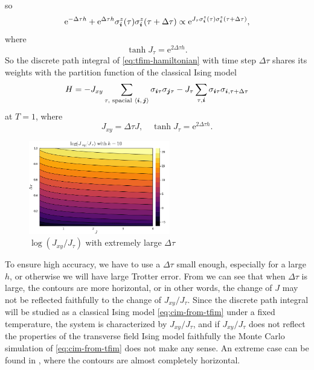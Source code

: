 \documentclass[hyperref, a4paper]{article}
\newcommand*{\ee}{\mathrm{e}}
\newcommand*{\pair}[1]{\langle #1 \rangle}
\newcommand*{\cim}{classical Ising model}
\begin{document}
so 
\[
    \ee^{- \Delta \tau h} + \ee^{\Delta \tau h} \sigma^z_{\vb*{i}}(\tau) \sigma^z_{\vb*{i}}(\tau + \Delta \tau) \propto \ee^{J_\tau \sigma^z_{\vb*{i}}(\tau) \sigma^z_{\vb*{i}}(\tau + \Delta \tau)},
\]
where
\[
    \tanh J_\tau = \ee^{2 \Delta \tau h}.
\]
So the discrete path integral of \eqref{eq:tfim-hamiltonian} with time step $\Delta \tau$ shares its weights with the partition function of the \cim
\begin{equation}
    H = - J_{xy} \sum_{\tau, \text{ spacial $\pair{\vb*{i}, \vb*{j}}$}} \sigma_{\vb*{i} \tau} \sigma_{\vb*{j} \tau} - J_\tau \sum_{\tau, \vb*{i}} \sigma_{\vb*{i} \tau} \sigma_{\vb*{i}, \tau + \Delta \tau}
    \label{eq:cim-from-tfim} 
\end{equation}
at $T = 1$, where
\begin{equation}
    J_{xy} = \Delta \tau J, \quad \tanh J_\tau = \ee^{2 \Delta \tau h}.
\end{equation}

\begin{figure}
    \centering
    \includegraphics[width=0.55\textwidth]{../analytical/jxy-jtau-ratio/ratio-h-10-extreme-range.PNG}
    \caption{$\log(J_{xy} / J_\tau)$ with extremely large $\Delta \tau$}
    \label{fig:extreme-tau}
\end{figure}

To ensure high accuracy, we have to use a $\Delta \tau$ small enough, especially for a large $h$, or otherwise we will have large Trotter error.
From  we can see that when $\Delta \tau$ is large, the contours are more horizontal, or in other words, the change of $J$ may not be reflected faithfully to the change of $J_{xy} / J_\tau$.
Since the discrete path integral will be studied as a classical Ising model \eqref{eq:cim-from-tfim} under a fixed temperature, the system is characterized by $J_{xy} / J_\tau$, and if $J_{xy} / J_\tau$ does not reflect the properties of the transverse field Ising model faithfully the Monte Carlo simulation of \eqref{eq:cim-from-tfim} does not make any sense.
An extreme case can be found in , where the contours are almost completely horizontal.
\end{document}
